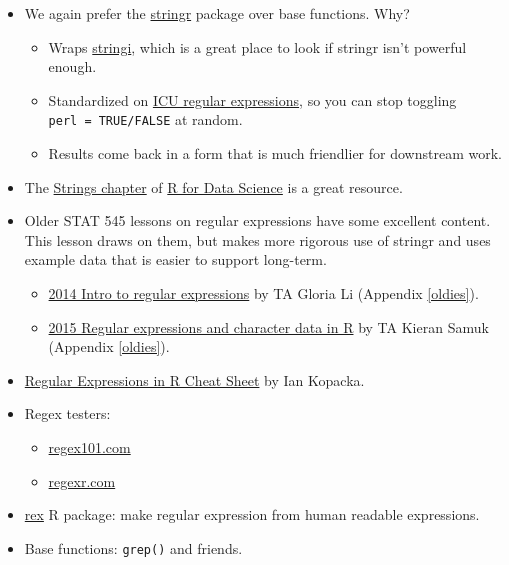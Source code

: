 \documentclass[
]{book}
\providecommand{\tightlist}{%
  \setlength{\itemsep}{0pt}\setlength{\parskip}{0pt}}
\begin{document}
\begin{itemize}
\tightlist
\item
  We again prefer the \href{https://stringr.tidyverse.org}{stringr} package over base functions. Why?

  \begin{itemize}
  \tightlist
  \item
    Wraps \href{http://www.gagolewski.com/software/stringi/}{stringi}, which is a great place to look if stringr isn't powerful enough.
  \item
    Standardized on \href{http://userguide.icu-project.org/strings/regexp}{ICU regular expressions}, so you can stop toggling \texttt{perl\ =\ TRUE/FALSE} at random.
  \item
    Results come back in a form that is much friendlier for downstream work.
  \end{itemize}
\item
  The \href{https://r4ds.had.co.nz/strings.html}{Strings chapter} of \href{https://r4ds.had.co.nz}{R for Data Science} \citep{wickham2016} is a great resource.
\item
  Older STAT 545 lessons on regular expressions have some excellent content. This lesson draws on them, but makes more rigorous use of stringr and uses example data that is easier to support long-term.

  \begin{itemize}
  \tightlist
  \item
    \protect\hyperlink{oldies}{2014 Intro to regular expressions} by TA Gloria Li (Appendix \ref{oldies}).
  \item
    \protect\hyperlink{oldies}{2015 Regular expressions and character data in R} by TA Kieran Samuk (Appendix \ref{oldies}).
  \end{itemize}
\item
  \href{https://github.com/rstudio/cheatsheets/raw/master/regex.pdf}{Regular Expressions in R Cheat Sheet} by Ian Kopacka.
\item
  Regex testers:

  \begin{itemize}
  \tightlist
  \item
    \href{https://regex101.com}{regex101.com}
  \item
    \href{https://regexr.com}{regexr.com}
  \end{itemize}
\item
  \href{https://github.com/kevinushey/rex}{rex} R package: make regular expression from human readable expressions.
\item
  Base functions: \texttt{grep()} and friends.
\end{itemize}
\end{document}
